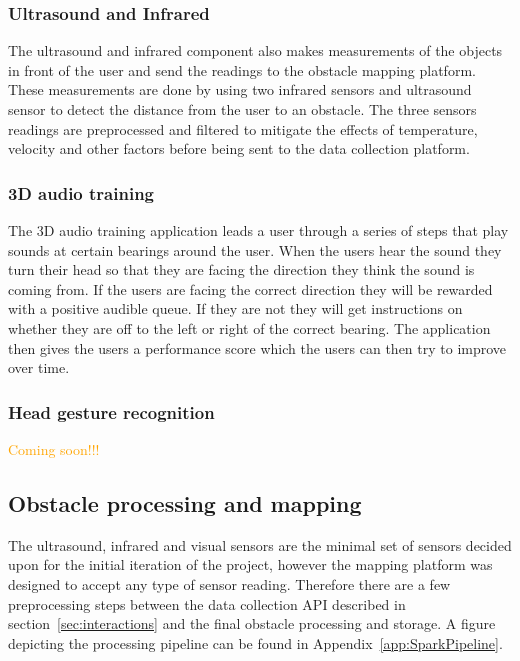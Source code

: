 \documentclass[prodmode,acmtosem]{acmsmall} %
\begin{document}
\subsubsection{Ultrasound and Infrared}
The ultrasound and infrared component also makes measurements of the objects in front of the user and send the readings to the obstacle mapping platform.
These measurements are done by using two infrared sensors and ultrasound sensor to detect the distance from the user to an obstacle. The three sensors readings are preprocessed and filtered to mitigate the effects of temperature, velocity and other factors before being sent to the data collection platform. 

\subsubsection{3D audio training}
The 3D audio training application leads a user through a series of steps that play sounds at certain bearings around the user. When the users hear the sound they turn their head so that they are facing the direction they think the sound is coming from. If the users are facing the correct direction they will be rewarded with a positive audible queue. If they are not they will get instructions on whether they are off to the left or right of the correct bearing. The application then gives the users a performance score which the users can then try to improve over time.

\subsubsection{Head gesture recognition}
\textcolor{orange}{Coming soon!!!}

\subsection{Obstacle processing and mapping}
The ultrasound, infrared and visual sensors are the minimal set of sensors decided upon for the initial iteration of the project, however the mapping platform was designed to accept any type of sensor reading. Therefore there are a few preprocessing steps between the data collection API described in section~\ref{sec:interactions} and the final obstacle processing and storage. A figure depicting the processing pipeline can be found in Appendix~\ref{app:SparkPipeline}.
\end{document}
